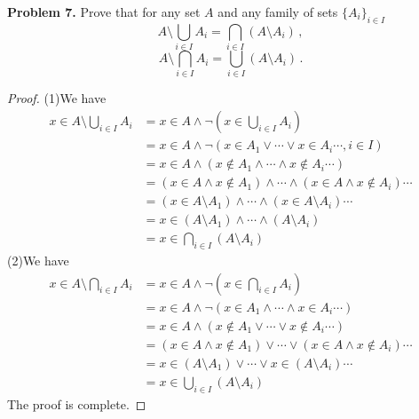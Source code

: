 \documentclass[12pt,leqno]{amsart}
\begin{document}
\noindent
{\bf Problem 7.}
{ Prove that for any set $A$ and any family of sets $\{ A_i\}_{i\in I}$
$$
A\setminus \bigcup_{i\in I} A_i =\bigcap_{i\in I} (A\setminus A_i)\, ,
$$
$$
A\setminus \bigcap_{i\in I} A_i = \bigcup_{i\in I} (A\setminus A_i)\, .
$$}
\begin{proof}
(1)We have
\begin{align*}
    x \in A\setminus \bigcup_{i\in I} A_i & = x\in A \wedge \neg \left(x \in \bigcup_{i\in I} A_i\right) \\
    & = x\in A \wedge \neg \left(x \in A_1 \vee  \cdots \vee x \in A_i \cdots, i \in I \right) \\
    & = x\in A \wedge \left(x \notin A_1 \wedge \cdots \wedge x\notin A_i \cdots \right) \\
    & = (x \in A \wedge x \notin A_1) \wedge \cdots \wedge (x \in A \wedge x \notin A_i) \cdots \\
    & = (x \in A \setminus A_1) \wedge \cdots \wedge (x \in A \setminus A_i) \cdots \\
    & = x \in (A \setminus A_1) \wedge \cdots \wedge (A \setminus A_i) \\
    & = x \in \bigcap_{i\in I} (A\setminus A_i)
\end{align*}
\hspace*{2em}(2)We have
\begin{align*}
    x \in A\setminus \bigcap_{i\in I} A_i & = x\in A \wedge \neg \left(x \in \bigcap_{i\in I} A_i \right) \\
    & = x\in A \wedge \neg (x\in A_1 \wedge \cdots \wedge x\in A_i \cdots) \\
    & = x\in A \wedge (x\notin A_1 \vee \cdots \vee x\notin A_i \cdots) \\
    & = (x\in A \wedge x\notin A_1) \vee \cdots \vee(x\in A \wedge x\notin A_i) \cdots \\
    & = x \in (A \setminus A_1) \vee \cdots \vee x \in (A \setminus A_i) \cdots \\
    & = x \in \bigcup_{i\in I} (A\setminus A_i)
\end{align*}
The proof is complete.
\end{proof}

\medskip
\end{document}
